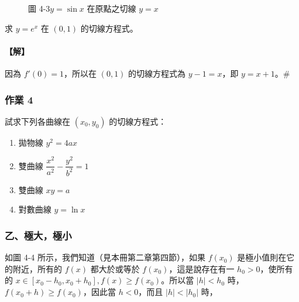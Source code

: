 \begin{figure}[H]
\centering
{}
\caption{圖 4-3\quad $y=\sin x$ 在原點之切線 $y=x$}
\label{fig:b6s-app4-sin-tangent}
\end{figure}

\begin{example}\label{ex:b6s-app4-20}
求 $y=e^x$ 在 $(0,1)$ 的切線方程式。
\end{example}

\paragraph{【解】}
因為 $f'(0)=1$，所以在 $(0,1)$ 的切線方程式為 $y-1=x$，即 $y=x+1$。\hfill$\#$

\subsubsection*{作業 4}
試求下列各曲線在 $(x_0, y_0)$ 的切線方程式：
\begin{enumerate}[label=(\roman*), leftmargin=2em]
  \item 拋物線 $y^2 = 4ax$
  \item 雙曲線 $\dfrac{x^2}{a^2} - \dfrac{y^2}{b^2} = 1$
  \item 雙曲線 $xy = a$
  \item 對數曲線 $y = \ln x$
\end{enumerate}

\subsubsection*{乙、極大，極小}

如圖 4-4 所示，我們知道（見本冊第二章第四節），如果 $f(x_0)$ 是極小值則在它的附近，所有的 $f(x)$ 都大於或等於 $f(x_0)$，這是說存在有一 $h_0>0$，使所有的 $x\in[x_0-h_0, x_0+h_0], f(x)\ge f(x_0)$。所以當 $|h|<h_0$ 時，$f(x_0+h)\ge f(x_0)$，因此當 $h<0$，而且 $|h|<|h_0|$ 時，


